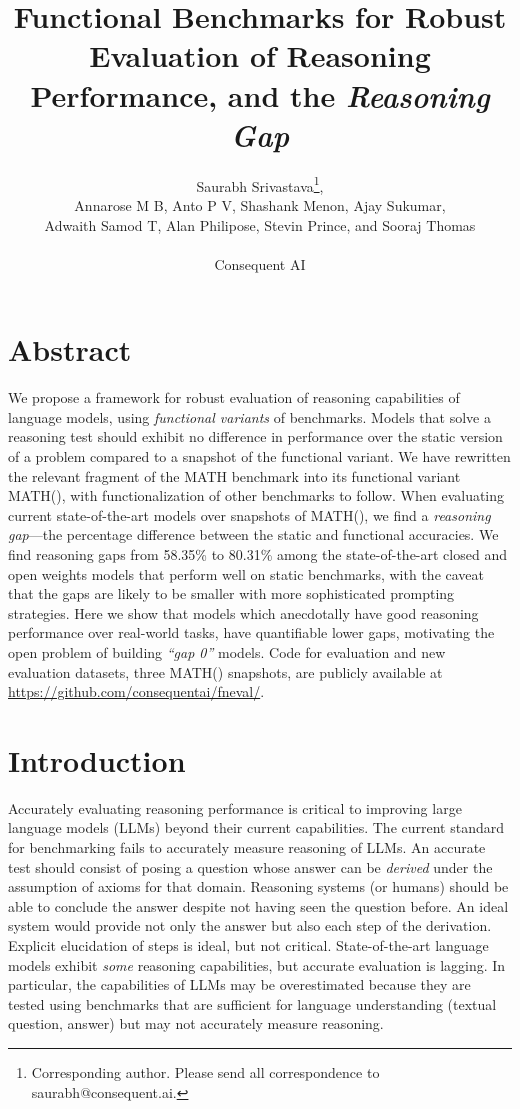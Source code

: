 \documentclass[11pt,a4paper]{article}
\title{
  Functional Benchmarks for Robust Evaluation of Reasoning Performance, and the
  {\em Reasoning Gap}
}
\author{Saurabh Srivastava\footnote{Corresponding author. Please send all correspondence to saurabh@consequent.ai.},\\
Annarose M B,
Anto P V,
Shashank Menon, Ajay Sukumar,\\
Adwaith Samod T,
Alan Philipose,
Stevin Prince, and
Sooraj Thomas\\\\
Consequent AI
}
\date{}
\begin{document}
\maketitle



\section{Abstract} We propose a framework for robust evaluation of reasoning
capabilities of language models, using {\em functional variants} of benchmarks.
Models that solve a reasoning test should exhibit no difference in performance
over the static version of a problem compared to a snapshot of the functional
variant. We have rewritten the relevant fragment of the MATH benchmark into its
functional variant MATH(), with functionalization of other benchmarks to
follow.  When evaluating current state-of-the-art models over snapshots of
MATH(), we find a {\em reasoning gap}---the percentage difference between the
static and functional accuracies. We find reasoning gaps from 58.35\% to
80.31\% among the state-of-the-art closed and open weights models that perform
well on static benchmarks, with the caveat that the gaps are likely to be
smaller with more sophisticated prompting strategies. Here we show that models
which anecdotally have good reasoning performance over real-world tasks, have
quantifiable lower gaps, motivating the open problem of building {\em ``gap
0''} models. Code for evaluation and new evaluation datasets, three MATH()
snapshots, are publicly available at
\url{https://github.com/consequentai/fneval/}.



\section{Introduction}

Accurately evaluating reasoning performance is critical to improving large
language models (LLMs) beyond their current capabilities. The current standard
for benchmarking fails to accurately measure reasoning of LLMs. An accurate
test should consist of posing a question whose answer can be {\em derived} under the
assumption of axioms for that domain. Reasoning systems (or humans) should be
able to conclude the answer despite not having seen the question before. An
ideal system would provide not only the answer but also each step of the
derivation.
Explicit elucidation of steps is ideal, but not critical. State-of-the-art
language models exhibit {\em some} reasoning capabilities, but accurate evaluation is
lagging. In particular, the capabilities of LLMs  may be overestimated because
they are tested using benchmarks that are sufficient for language understanding
(textual question, answer) but may not accurately measure reasoning.
\end{document}
